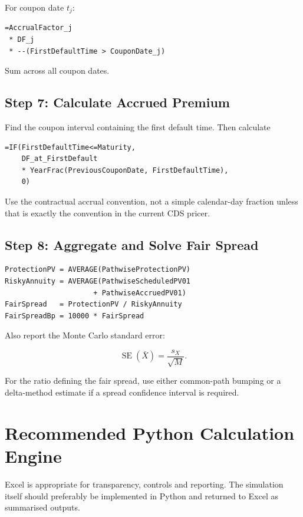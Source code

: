 \documentclass[11pt,a4paper]{article}
\begin{document}
For coupon date $t_j$:

\begin{lstlisting}
=AccrualFactor_j
 * DF_j
 * --(FirstDefaultTime > CouponDate_j)
\end{lstlisting}

Sum across all coupon dates.

\subsection{Step 7: Calculate Accrued Premium}

Find the coupon interval containing the first default time. Then calculate

\begin{lstlisting}
=IF(FirstDefaultTime<=Maturity,
    DF_at_FirstDefault
    * YearFrac(PreviousCouponDate, FirstDefaultTime),
    0)
\end{lstlisting}

Use the contractual accrual convention, not a simple calendar-day fraction unless that is exactly the convention in the current CDS pricer.

\subsection{Step 8: Aggregate and Solve Fair Spread}

\begin{lstlisting}
ProtectionPV = AVERAGE(PathwiseProtectionPV)
RiskyAnnuity = AVERAGE(PathwiseScheduledPV01
                     + PathwiseAccruedPV01)
FairSpread   = ProtectionPV / RiskyAnnuity
FairSpreadBp = 10000 * FairSpread
\end{lstlisting}

Also report the Monte Carlo standard error:

\[
\operatorname{SE}(\bar X)
=
\frac{s_X}{\sqrt{M}}.
\]

For the ratio defining the fair spread, use either common-path bumping or a delta-method estimate if a spread confidence interval is required.

\section{Recommended Python Calculation Engine}

Excel is appropriate for transparency, controls and reporting. The simulation itself should preferably be implemented in Python and returned to Excel as summarised outputs.
\end{document}
